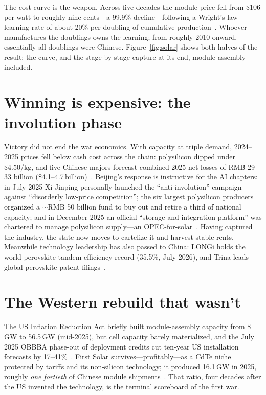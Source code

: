 The cost curve is the weapon. Across five decades the module price fell from \$106 per watt to roughly nine cents---a 99.9\% decline---following a Wright's-law learning rate of about 20\% per doubling of cumulative production~\cite{owid-learning,energytrend-prices}. Whoever manufactures the doublings owns the learning; from roughly 2010 onward, essentially all doublings were Chinese. Figure~\ref{fig:solar} shows both halves of the result: the curve, and the stage-by-stage capture at its end, module assembly included.



\section{Winning is expensive: the involution phase}

Victory did not end the war economics. With capacity at triple demand, 2024--2025 prices fell below cash cost across the chain: polysilicon dipped under \$4.50/kg, and five Chinese majors forecast combined 2025 net losses of RMB 29--33 billion (\$4.1--4.7\,billion)~\cite{pv-losses-2025}. Beijing's response is instructive for the AI chapters: in July 2025 Xi Jinping personally launched the ``anti-involution'' campaign against ``disorderly low-price competition''; the six largest polysilicon producers organized a $\sim$RMB 50 billion fund to buy out and retire a third of national capacity; and in December 2025 an official ``storage and integration platform'' was chartered to manage polysilicon supply---an OPEC-for-solar~\cite{anti-involution,poly-fund,poly-platform}. Having captured the industry, the state now moves to cartelize it and harvest stable rents. Meanwhile technology leadership has also passed to China: LONGi holds the world perovskite-tandem efficiency record (35.5\%, July 2026), and Trina leads global perovskite patent filings~\cite{longi-record,trina-patents}.

\section{The Western rebuild that wasn't}

The US Inflation Reduction Act briefly built module-assembly capacity from 8\,GW to 56.5\,GW (mid-2025), but cell capacity barely materialized, and the July 2025 OBBBA phase-out of deployment credits cut ten-year US installation forecasts by 17--41\%~\cite{ira-build,obbba}. First Solar survives---profitably---as a CdTe niche protected by tariffs and its non-silicon technology; it produced 16.1\,GW in 2025, roughly \emph{one fortieth} of Chinese module shipments~\cite{firstsolar}. That ratio, four decades after the US invented the technology, is the terminal scoreboard of the first war.

